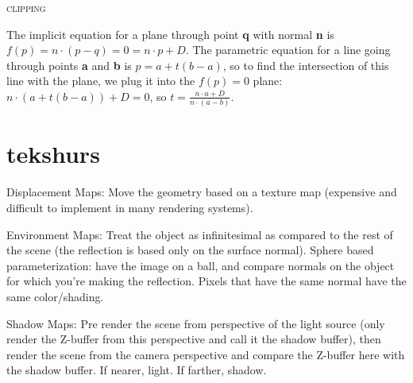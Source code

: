 \documentclass{article}
\begin{document}
\begin{center}\textsc{clipping}\end{center} 
The implicit equation for a plane through point {\bf q} with normal {\bf n} is $f(p)=n\cdot(p-q)=0 = n\cdot p + D$. The parametric equation for a line going through points {\bf a} and {\bf b} is $p=a+t(b-a)$, so to find the intersection of this line with the plane, we plug it into the $f(p)=0$ plane: $n\cdot(a+t(b-a))+D=0$, so $t=\frac{n\cdot a + D}{n\cdot(a-b)} $.
\section{tekshurs} %
\label{sec:tekshurs}
Displacement Maps: Move the geometry based on a texture map (expensive and difficult to implement in many rendering systems).

Environment Maps: Treat the object as infinitesimal as compared to the rest of the scene (the reflection is based only on the surface normal). Sphere based parameterization: have the image on a ball, and compare normals on the object for which you're making the reflection. Pixels that have the same normal have the same color/shading.

Shadow Maps: Pre render the scene from perspective of the light source (only render the Z-buffer from this perspective and call it the shadow buffer), then render the scene from the camera perspective and compare the Z-buffer here with the shadow buffer. If nearer, light. If farther, shadow.

\end{document}
